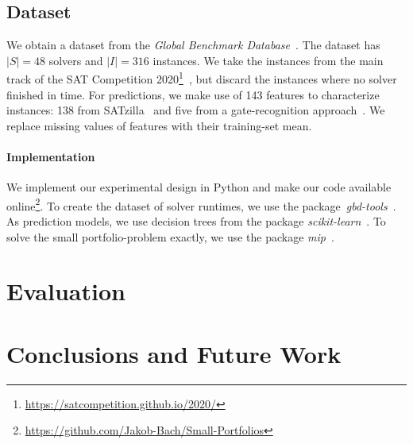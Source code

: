 \documentclass[conference]{IEEEtran}
\begin{document}
\subsection{Dataset}

We obtain a dataset from the \emph{Global Benchmark Database}~\cite{iser2020collaborative}.
The dataset has $|S| = 48$ solvers and $|I| = 316$ instances.
We take the instances from the main track of the SAT Competition 2020\footnote{\url{https://satcompetition.github.io/2020/}}~\cite{balyo2020proceedings}, but discard the instances where no solver finished in time.
For predictions, we make use of 143 features to characterize instances:
138 from SATzilla~\cite{xu2008satzilla, xu2012satzilla2012} and five from a gate-recognition approach~\cite{iser2020recognition}.
We replace missing values of features with their training-set mean.


\paragraph{Implementation}

We implement our experimental design in Python and make our code available online\footnote{\url{https://github.com/Jakob-Bach/Small-Portfolios}}.
To create the dataset of solver runtimes, we use the package~\emph{gbd-tools}~\cite{iser2020collaborative}.
As prediction models, we use decision trees from the package \emph{scikit-learn}~\cite{scikit-learn}.
To solve the small portfolio-problem exactly, we use the package \emph{mip}~\cite{python-mip}.

\section{Evaluation}
\label{sec:evaluation}

\section{Conclusions and Future Work}
\label{sec:conclusion}




\end{document}
